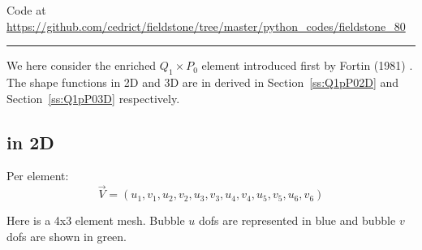 

\begin{center}
Code at \url{https://github.com/cedrict/fieldstone/tree/master/python_codes/fieldstone_80}
\end{center}

\par\noindent\rule{\textwidth}{0.4pt}

We here consider the enriched $Q_1\times P_0$ element introduced first by Fortin (1981) \cite{fort81}.
The shape functions in 2D and 3D are in derived in Section~\ref{ss:Q1pP02D} and Section~\ref{ss:Q1pP03D} respectively.


\subsection*{in 2D}

Per element:
\[
\vec{V} = (u_1,v_1,u_2,v_2,u_3,v_3,u_4,v_4,u_5,v_5,u_6,v_6)
\]

Here is a 4x3 element mesh. Bubble $u$ dofs are represented in blue and bubble $v$ dofs are shown in green.


